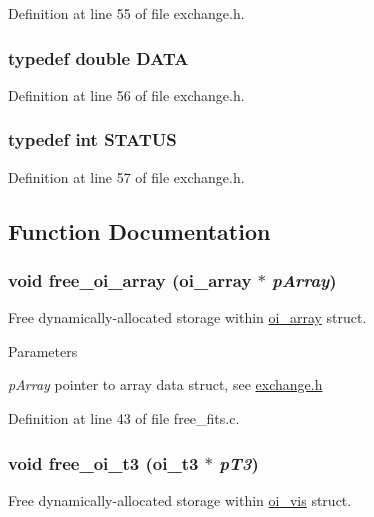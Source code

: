 Definition at line 55 of file exchange.h.

\hypertarget{group__oitable_gaad99e8bad1a589e9f406f33403d42ca7}{
\subsubsection[{DATA}]{\setlength{\rightskip}{0pt plus 5cm}typedef double {\bf DATA}}}
\label{group__oitable_gaad99e8bad1a589e9f406f33403d42ca7}


Definition at line 56 of file exchange.h.

\hypertarget{group__oitable_ga0cb9c7fae5afe4237eb4d5d43318fa18}{
\subsubsection[{STATUS}]{\setlength{\rightskip}{0pt plus 5cm}typedef int {\bf STATUS}}}
\label{group__oitable_ga0cb9c7fae5afe4237eb4d5d43318fa18}


Definition at line 57 of file exchange.h.



\subsection{Function Documentation}
\hypertarget{group__oitable_gaa4b06f2b9fc01b4fe3115457554d43fa}{
\subsubsection[{free\_\-oi\_\-array}]{\setlength{\rightskip}{0pt plus 5cm}void free\_\-oi\_\-array ({\bf oi\_\-array} $\ast$ {\em pArray})}}
\label{group__oitable_gaa4b06f2b9fc01b4fe3115457554d43fa}
Free dynamically-\/allocated storage within \hyperlink{structoi__array}{oi\_\-array} struct.


\begin{DoxyParams}{Parameters}
\item[{\em pArray}]pointer to array data struct, see \hyperlink{exchange_8h}{exchange.h} \end{DoxyParams}


Definition at line 43 of file free\_\-fits.c.

\hypertarget{group__oitable_ga4a228cff5256bffc18536c8d657a94bb}{
\subsubsection[{free\_\-oi\_\-t3}]{\setlength{\rightskip}{0pt plus 5cm}void free\_\-oi\_\-t3 ({\bf oi\_\-t3} $\ast$ {\em pT3})}}
\label{group__oitable_ga4a228cff5256bffc18536c8d657a94bb}
Free dynamically-\/allocated storage within \hyperlink{structoi__vis}{oi\_\-vis} struct.


